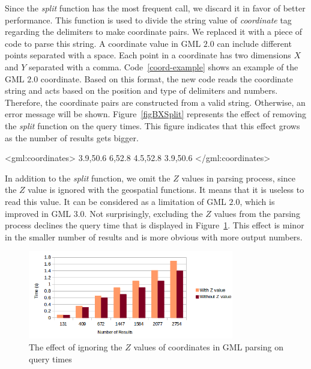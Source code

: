 \documentclass[a4paper,12pt]{article}
\begin{document}
Since the \textit{split} function has the most frequent call, we discard it in favor of better performance. This function is used to divide the string value of \textit{coordinate} tag regarding the delimiters to make coordinate pairs. We replaced it with a piece of code to parse this string. 
A coordinate value in GML $2.0$ can include different points separated with a space. Each point in a coordinate has two dimensions $X$ and $Y$ separated with a comma. Code~\ref{coord-example} shows an example of the GML $2.0$ coordinate. Based on this format, the new code reads the coordinate string and acts based on the position and type of delimiters and numbers. Therefore, the coordinate pairs are constructed from a valid string. Otherwise, an error message will be shown. Figure~\ref{figBXSplit} represents the effect of removing the \textit{split} function on the query times. This figure indicates that this effect grows as the number of results gets bigger.
 
\vspace{10px}
\begin{fakeXML}[label=coord-example,caption=An example of GML 2.0 coordinate]
<gml:coordinates>
  3.9,50.6 6,52.8 4.5,52.8 3.9,50.6
</gml:coordinates>
\end{fakeXML}
\vspace{10px}

In addition to the \textit{split} function, we omit the $Z$ values in parsing process, since the $Z$ value is ignored with the geospatial functions. It means that it is useless to read this value. It can be considered as a limitation of GML $2.0$, which is improved in GML $3.0$. Not surprisingly, excluding the $Z$ values from the parsing process declines the query time that is displayed in Figure~\ref{figBXZvalue}. This effect is minor in the smaller number of results and is more obvious with more output numbers.

\begin{figure}
\centering
\includegraphics[width=0.8\textwidth]{BXZvalue-sec}
\caption{The effect of ignoring the $Z$ values of coordinates in GML parsing on query times}
\label{figBXZvalue}
\end{figure}
\end{document}
